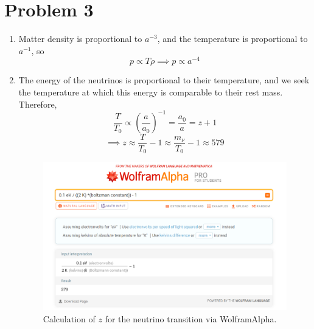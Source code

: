 \documentclass[12pt]{article}
\begin{document}
\section*{Problem 3}
\begin{enumerate}[label=(\alph*)]
    \item Matter density is proportional to $a^{-3}$, and the temperature is proportional to $a^{-1}$, so 
    \[ p \propto T\rho \implies \boxed{p \propto a^{-4}} \]

    \item The energy of the neutrinos is proportional to their temperature, and we seek the temperature at which this energy is comparable to their rest mass. Therefore,
    \[ \frac{T}{T_0} \propto \left(\frac{a}{a_0}\right)^{-1} = \frac{a_0}{a} = z + 1 \]
    \[ \implies z \approx \frac{T}{T_0} - 1 \approx \frac{m_\nu}{T_0} - 1 \approx \boxed{579} \]

    \begin{figure}[h]
        \includegraphics[scale=0.5]{3b.PNG}
        \centering
        \caption{Calculation of $z$ for the neutrino transition via WolframAlpha.}
        \label{fig2}
    \end{figure}
\end{enumerate}
\end{document}
